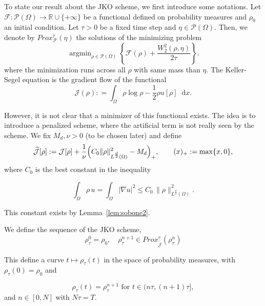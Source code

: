 \documentclass[a4paper,twosided, 11pt]{article}
\renewcommand{\color}[2][]{}
\newcommand{\R}{\mathbb{R}}
\newcommand {\f}   {\frac}
\DeclareMathOperator*{\argmin}{argmin}
\theoremstyle{plain}
\theoremstyle{remark}
\newcommand{\diff}{\mathop{}\!\mathrm{d}}
\numberwithin{equation}{section}
\begin{document}
    To state our result about the JKO scheme, we first introduce some notations. Let $\mathcal{F}: \mathcal{P}(\Omega)\to \R\cup\{+\infty\}$ be a functional defined on probability measures and $\rho_{0}$ an initial condition. Let $\tau>0$ be a fixed time step and $\eta\in \mathcal{P}(\Omega)$. Then, we denote by $Prox_{\mathcal{F}}^{\tau}(\eta)$ the solutions of the minimizing problem
$$
\argmin_{\rho\in\mathcal{P}(\Omega)} \left\{\mathcal{F}({\color{blue}\rho}) + \f{W^{2}_{2}(\rho,\eta)}{2\tau}\right\}.
$$
where the minimization runs across all $\rho$ with same mass than $\eta$.
The Keller-Segel equation is the gradient flow of the functional
\begin{equation}\label{eq:functional_gradientflow_KS}
\mathcal{J}(\rho) : = \int_{\Omega} \rho\log \rho -\f{1}{2} \rho u[\rho]\diff x.   
\end{equation}
{\color{blue}
However, it is not clear that a minimizer of this functional exists. The idea is to introduce a penalized scheme, where the artificial term is not really seen by the scheme.  We fix $M_d,\nu>0$ (to be chosen later) and define
\[
\widetilde{\mathcal{J}}[\rho]
 := 
\mathcal{J}[\rho] + \frac{1}{\nu}\Bigl(C_0\|\rho\|_{L^{\frac d2}(\Omega)}^2-M_d\Bigr)_+,
\qquad (x)_+:=\max\{x,0\},
\]
where $C_0$ is the best constant in the inequality 

\begin{equation}\label{eq:estimate_H1_Ld_rewritten}
\int_\Omega \rho\,u  = \int_\Omega |\nabla u|^2
 \le  C_0\,\|\rho\|_{L^{\frac d2}(\Omega)}^2.
\end{equation}

This constant exists by Lemma~\ref{lem:sobone2}.

We define the sequence of the JKO scheme, 
\begin{equation}\label{eq:def_JKO}
\rho_{\tau}^{0} = \rho_0, \quad \rho_\tau^{n+1} \in Prox_{\widetilde{\mathcal{J}}}^{\tau}(\rho^{n}_{\tau})
\end{equation}

}
This define a curve \( t \mapsto \rho_\tau(t) \) in the space of probability measures, with \(\rho_\tau(0) = \rho_0\) and 

\begin{equation}\label{eq:def_JKO2}
\rho_\tau(t) = \rho_\tau^{n+1} \text{ for } t \in (n\tau, (n+1)\tau],
\end{equation}
and $n\in[0,N]$ with $N\tau=T$.
\end{document}
